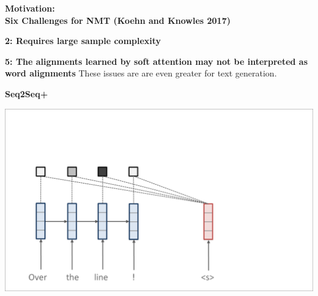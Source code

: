 \documentclass[aspectratio=169]{beamer}
\let\tempone\itemize
\let\temptwo\enditemize
\renewenvironment{itemize}{\tempone\addtolength{\itemsep}{0.5\baselineskip}}{\temptwo}
\newcommand{\thetitle}[1]{{\begin{center}\textbf{{#1}}\end{center}}}
\newcommand{\air}{\vspace{0.25cm}}
\begin{document}
\begin{frame}
\thetitle{Motivation: \\
  Six Challenges for NMT (Koehn and Knowles 2017)}
\begin{itemize}
    \item \textbf{2: Requires large sample complexity}
    \air
    \item \textbf{5: The alignments learned by soft attention may not
        be interpreted as word alignments}
    \air
\end{itemize}
These issues are are even greater for text generation.
\end{frame}






\begin{frame}
  \begin{center}
    \textbf{Seq2Seq+} \air

  \end{center}
\center
\vspace{-5mm}
 \air
\includegraphics[scale=0.37]{nmt-attn3}
\end{frame}
\end{document}
